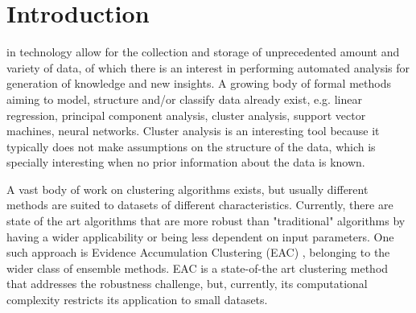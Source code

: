 
\section{Introduction}
\label{sec:intro}



 in technology allow for the collection and storage of unprecedented amount and variety of data, of which there is an interest in performing automated analysis for generation of knowledge and new insights.
A growing body of formal methods aiming to model, structure and/or classify data already exist, e.g. linear regression, principal component analysis, cluster analysis, support vector machines, neural networks.
Cluster analysis is an interesting tool because it typically does not make assumptions on the structure of the data, which is specially interesting when no prior information about the data is known.

A vast body of work on clustering algorithms exists, but usually different methods are suited to datasets of different characteristics.
Currently, there are state of the art algorithms that are more robust than "traditional" algorithms by having a wider applicability or being less dependent on input parameters.
One such approach is Evidence Accumulation Clustering (EAC) \cite{Fred2005}, belonging to the wider class of ensemble methods.
EAC is a state-of-the art clustering method that addresses the robustness challenge, but, currently, its computational complexity restricts its application to small datasets.


